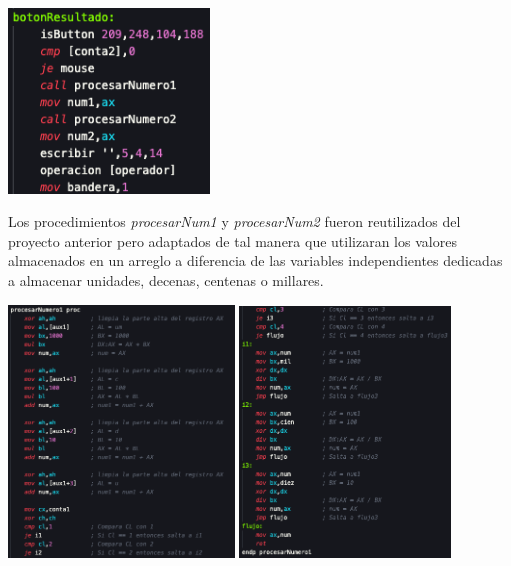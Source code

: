 \documentclass[letterpaper,12 pt,titlepage]{article}
\begin{document}
    \begin{center}
        \includegraphics[width=0.4\textwidth]{img/25.png}
    \end{center}

    Los procedimientos \textit{procesarNum1} y \textit{procesarNum2} fueron reutilizados del proyecto anterior pero adaptados de tal manera que utilizaran los valores almacenados en un arreglo a diferencia de las variables independientes dedicadas a almacenar unidades, decenas, centenas o millares.

    \begin{center}
        \includegraphics[width=0.45\textwidth]{img/26.png}
        \includegraphics[width=0.42\textwidth]{img/27.png}
    \end{center}
\end{document}
